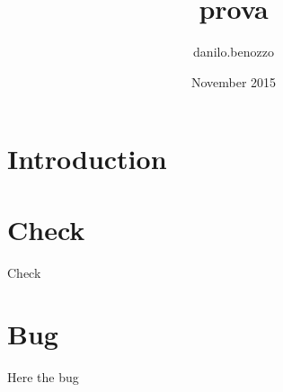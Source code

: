 \documentclass{article}
\title{prova}
\author{danilo.benozzo }
\date{November 2015}
\begin{document}
\maketitle

\section{Introduction}


\section{Check}
Check

\section{Bug}
Here the bug
\end{document}
